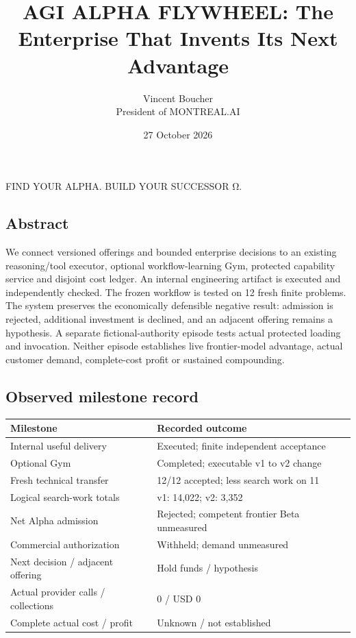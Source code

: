 \documentclass[
  10pt,
]{article}
\title{AGI ALPHA FLYWHEEL: The Enterprise That Invents Its Next
Advantage}
\author{Vincent Boucher\\President of MONTREAL.AI}
\date{27 October 2026}
\begin{document}
\maketitle

FIND YOUR ALPHA. BUILD YOUR SUCCESSOR Ω.

\hypertarget{abstract}{%
\subsection{Abstract}\label{abstract}}

We connect versioned offerings and bounded enterprise decisions to an
existing reasoning/tool executor, optional workflow-learning Gym,
protected capability service and disjoint cost ledger. An internal
engineering artifact is executed and independently checked. The frozen
workflow is tested on 12 fresh finite problems. The system preserves the
economically defensible negative result: admission is rejected,
additional investment is declined, and an adjacent offering remains a
hypothesis. A separate fictional-authority episode tests actual
protected loading and invocation. Neither episode establishes live
frontier-model advantage, actual customer demand, complete-cost profit
or sustained compounding.

\hypertarget{observed-milestone-record}{%
\subsection{Observed milestone record}\label{observed-milestone-record}}

\begin{longtable}[]{@{}ll@{}}
\toprule\noalign{}
Milestone & Recorded outcome \\
\midrule\noalign{}
\endhead
\bottomrule\noalign{}
\endlastfoot
Internal useful delivery & Executed; finite independent acceptance \\
Optional Gym & Completed; executable v1 to v2 change \\
Fresh technical transfer & 12/12 accepted; less search work on 11 \\
Logical search-work totals & v1: 14,022; v2: 3,352 \\
Net Alpha admission & Rejected; competent frontier Beta unmeasured \\
Commercial authorization & Withheld; demand unmeasured \\
Next decision / adjacent offering & Hold funds / hypothesis \\
Actual provider calls / collections & 0 / USD 0 \\
Complete actual cost / profit & Unknown / not established \\
\end{longtable}
\end{document}
